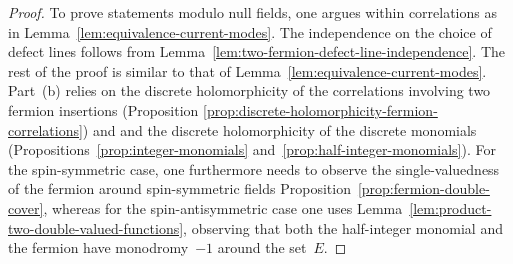 \documentclass[12pt,oneside,english]{amsart}
\numberwithin{equation}{section}
\numberwithin{figure}{section}
\theoremstyle{plain}
\theoremstyle{plain}
\theoremstyle{plain}
\theoremstyle{plain}
\theoremstyle{remark}
\theoremstyle{definition}
\theoremstyle{plain}
\theoremstyle{plain}
\numberwithin{thm}{section}
\begin{document}
% 
\begin{proof}
To prove statements modulo null fields,
one argues within correlations as in
Lemma~\ref{lem:equivalence-current-modes}.
The independence on the choice of defect 
lines follows from Lemma~\ref{lem:two-fermion-defect-line-independence}.
The rest of the proof is similar to that of 
Lemma~\ref{lem:equivalence-current-modes}.
Part~(b) relies on the discrete holomorphicity of the correlations
involving two fermion insertions (Proposition 
\ref{prop:discrete-holomorphicity-fermion-correlations}) and
and the discrete holomorphicity
of the discrete monomials (Propositions~\ref{prop:integer-monomials}
and~\ref{prop:half-integer-monomials}). 
For the spin-symmetric case, one furthermore needs to observe the
single-valuedness of the fermion around spin-symmetric fields
Proposition~\ref{prop:fermion-double-cover}, whereas for the spin-antisymmetric 
case one
uses Lemma~\ref{lem:product-two-double-valued-functions}, observing that 
both the half-integer monomial and the fermion have 
monodromy~$-1$ around the set~$E$.
% 
% 
\end{proof}
\end{document}
